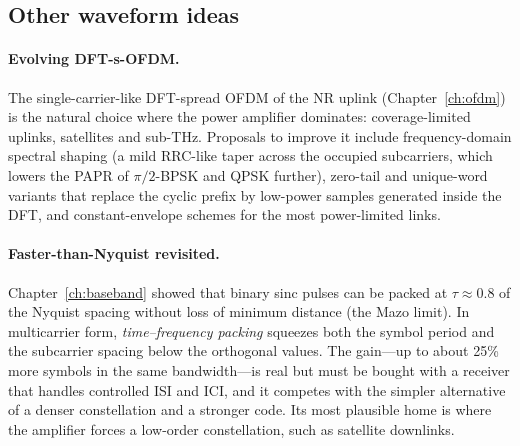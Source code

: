 \subsection{Other waveform ideas}

\paragraph{Evolving DFT-s-OFDM.} The single-carrier-like DFT-spread OFDM of the NR uplink
(Chapter~\ref{ch:ofdm}) is the natural choice where the power amplifier dominates: coverage-limited
uplinks, satellites and sub-THz. Proposals to improve it include frequency-domain spectral shaping
(a mild RRC-like taper across the occupied subcarriers, which lowers the PAPR of $\pi/2$-BPSK and QPSK
further), zero-tail and unique-word variants that replace the cyclic prefix by low-power samples
generated inside the DFT, and constant-envelope schemes for the most power-limited links.

\paragraph{Faster-than-Nyquist revisited.} Chapter~\ref{ch:baseband} showed that binary sinc pulses
can be packed at $\tau\approx0.8$ of the Nyquist spacing without loss of minimum distance (the Mazo
limit). In multicarrier form, \emph{time--frequency packing} squeezes both the symbol period and the
subcarrier spacing below the orthogonal values. The gain---up to about 25\% more symbols in the same
bandwidth---is real but must be bought with a receiver that handles controlled ISI and ICI, and it
competes with the simpler alternative of a denser constellation and a stronger code. Its most
plausible home is where the amplifier forces a low-order constellation, such as satellite downlinks.


